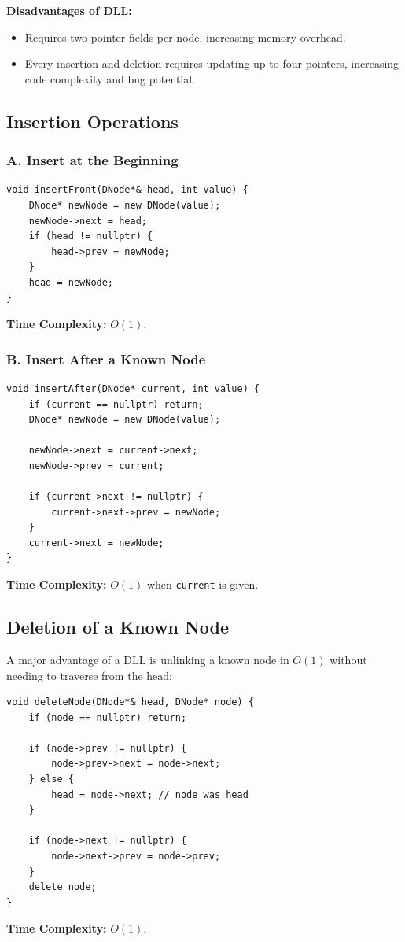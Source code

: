 \textbf{Disadvantages of DLL:}
\begin{itemize}
    \item Requires two pointer fields per node, increasing memory overhead.
    \item Every insertion and deletion requires updating up to four pointers, increasing code complexity and bug potential.
\end{itemize}

\subsection{Insertion Operations}

\subsubsection{A. Insert at the Beginning}
\begin{lstlisting}[style=cppstyle]
void insertFront(DNode*& head, int value) {
    DNode* newNode = new DNode(value);
    newNode->next = head;
    if (head != nullptr) {
        head->prev = newNode;
    }
    head = newNode;
}
\end{lstlisting}
\textbf{Time Complexity:} $O(1)$.

\subsubsection{B. Insert After a Known Node}
\begin{lstlisting}[style=cppstyle]
void insertAfter(DNode* current, int value) {
    if (current == nullptr) return;
    DNode* newNode = new DNode(value);

    newNode->next = current->next;
    newNode->prev = current;

    if (current->next != nullptr) {
        current->next->prev = newNode;
    }
    current->next = newNode;
}
\end{lstlisting}
\textbf{Time Complexity:} $O(1)$ when \texttt{current} is given.

\subsection{Deletion of a Known Node}

A major advantage of a DLL is unlinking a known node in $O(1)$ without needing to traverse from the head:

\begin{lstlisting}[style=cppstyle]
void deleteNode(DNode*& head, DNode* node) {
    if (node == nullptr) return;

    if (node->prev != nullptr) {
        node->prev->next = node->next;
    } else {
        head = node->next; // node was head
    }

    if (node->next != nullptr) {
        node->next->prev = node->prev;
    }
    delete node;
}
\end{lstlisting}
\textbf{Time Complexity:} $O(1)$.

